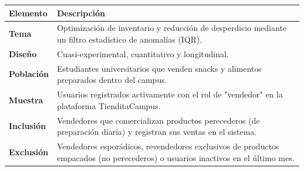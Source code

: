 \documentclass[12pt,a4paper]{article}
\begin{document}
\begin{table}[h!]
    \centering
    \renewcommand{\arraystretch}{1.8} %
    \begin{tabularx}{\textwidth}{>{\bfseries}l X}
        \toprule
        Elemento & Descripción \\
        \midrule
        Tema & Optimización de inventario y reducción de desperdicio mediante un filtro estadístico de anomalías (IQR). \\
        Diseño & Cuasi-experimental, cuantitativo y longitudinal. \\
        Población & Estudiantes universitarios que venden snacks y alimentos preparados dentro del campus. \\
        Muestra & Usuarios registrados activamente con el rol de "vendedor" en la plataforma TienditaCampus. \\
        Inclusión & Vendedores que comercializan productos perecederos (de preparación diaria) y registran sus ventas en el sistema. \\
        Exclusión & Vendedores esporádicos, revendedores exclusivos de productos empacados (no perecederos) o usuarios inactivos en el último mes. \\
        \bottomrule
    \end{tabularx}
\end{table}
\end{document}

